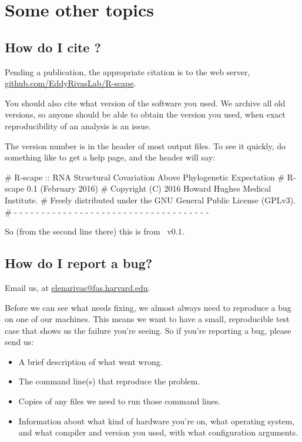 
\section{Some other topics}
\label{section:more}
\setcounter{footnote}{0}

\subsection{How do I cite \rscape?}

Pending a publication, the appropriate citation is to the web server,
\url{github.com/EddyRivasLab/R-scape}.

You should also cite what version of the software you used. We archive
all old versions, so anyone should be able to obtain the version you
used, when exact reproducibility of an analysis is an issue.

The version number is in the header of most output files. To see it
quickly, do something like  to get a help page, and
the header will say:

\begin{sreoutput}
# R-scape :: RNA Structural Covariation Above Phylogenetic Expectation
# R-scape 0.1 (February 2016)
# Copyright (C) 2016 Howard Hughes Medical Institute.
# Freely distributed under the GNU General Public License (GPLv3).
# - - - - - - - - - - - - - - - - - - - - - - - - - - - - - - - - - - - -
\end{sreoutput}

So (from the second line there) this is from \rscape\ v0.1.

\subsection{How do I report a bug?}

Email us, at \url{elenarivas@fas.harvard.edu}.

Before we can see what needs fixing, we almost always need to
reproduce a bug on one of our machines. This means we want to have a
small, reproducible test case that shows us the failure you're seeing.
So if you're reporting a bug, please send us:

\begin{itemize}
 \item A brief description of what went wrong.
 \item The command line(s) that reproduce the problem.
 \item Copies of any files we need to run those command lines.
 \item Information about what kind of hardware you're on, what
   operating system, and what compiler and version you used, with what
   configuration arguments.
\end{itemize}



